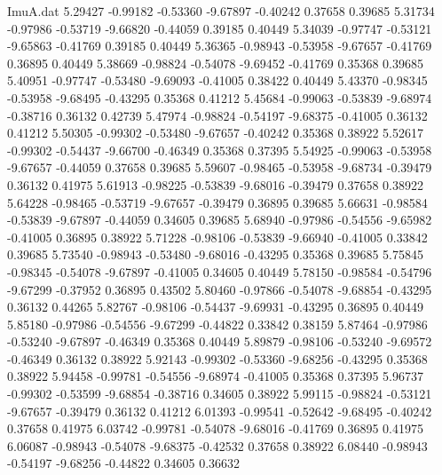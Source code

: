 \begin{filecontents}{ImuA.dat}
   5.29427   -0.99182   -0.53360   -9.67897   -0.40242    0.37658    0.39685
   5.31734   -0.97986   -0.53719   -9.66820   -0.44059    0.39185    0.40449
   5.34039   -0.97747   -0.53121   -9.65863   -0.41769    0.39185    0.40449
   5.36365   -0.98943   -0.53958   -9.67657   -0.41769    0.36895    0.40449
   5.38669   -0.98824   -0.54078   -9.69452   -0.41769    0.35368    0.39685
   5.40951   -0.97747   -0.53480   -9.69093   -0.41005    0.38422    0.40449
   5.43370   -0.98345   -0.53958   -9.68495   -0.43295    0.35368    0.41212
   5.45684   -0.99063   -0.53839   -9.68974   -0.38716    0.36132    0.42739
   5.47974   -0.98824   -0.54197   -9.68375   -0.41005    0.36132    0.41212
   5.50305   -0.99302   -0.53480   -9.67657   -0.40242    0.35368    0.38922
   5.52617   -0.99302   -0.54437   -9.66700   -0.46349    0.35368    0.37395
   5.54925   -0.99063   -0.53958   -9.67657   -0.44059    0.37658    0.39685
   5.59607   -0.98465   -0.53958   -9.68734   -0.39479    0.36132    0.41975
   5.61913   -0.98225   -0.53839   -9.68016   -0.39479    0.37658    0.38922
   5.64228   -0.98465   -0.53719   -9.67657   -0.39479    0.36895    0.39685
   5.66631   -0.98584   -0.53839   -9.67897   -0.44059    0.34605    0.39685
   5.68940   -0.97986   -0.54556   -9.65982   -0.41005    0.36895    0.38922
   5.71228   -0.98106   -0.53839   -9.66940   -0.41005    0.33842    0.39685
   5.73540   -0.98943   -0.53480   -9.68016   -0.43295    0.35368    0.39685
   5.75845   -0.98345   -0.54078   -9.67897   -0.41005    0.34605    0.40449
   5.78150   -0.98584   -0.54796   -9.67299   -0.37952    0.36895    0.43502
   5.80460   -0.97866   -0.54078   -9.68854   -0.43295    0.36132    0.44265
   5.82767   -0.98106   -0.54437   -9.69931   -0.43295    0.36895    0.40449
   5.85180   -0.97986   -0.54556   -9.67299   -0.44822    0.33842    0.38159
   5.87464   -0.97986   -0.53240   -9.67897   -0.46349    0.35368    0.40449
   5.89879   -0.98106   -0.53240   -9.69572   -0.46349    0.36132    0.38922
   5.92143   -0.99302   -0.53360   -9.68256   -0.43295    0.35368    0.38922
   5.94458   -0.99781   -0.54556   -9.68974   -0.41005    0.35368    0.37395
   5.96737   -0.99302   -0.53599   -9.68854   -0.38716    0.34605    0.38922
   5.99115   -0.98824   -0.53121   -9.67657   -0.39479    0.36132    0.41212
   6.01393   -0.99541   -0.52642   -9.68495   -0.40242    0.37658    0.41975
   6.03742   -0.99781   -0.54078   -9.68016   -0.41769    0.36895    0.41975
   6.06087   -0.98943   -0.54078   -9.68375   -0.42532    0.37658    0.38922
   6.08440   -0.98943   -0.54197   -9.68256   -0.44822    0.34605    0.36632

\end{filecontents}
